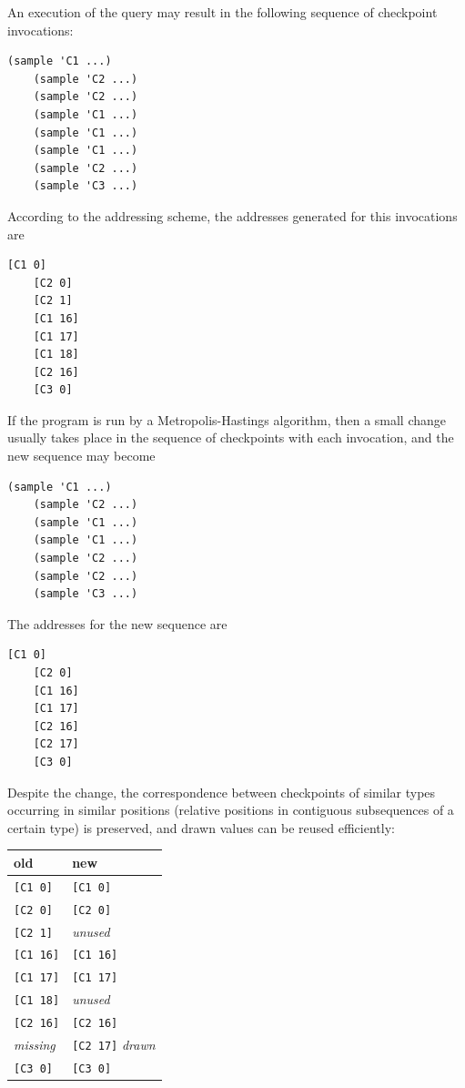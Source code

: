\documentclass[preprint]{sigplanconf}
\begin{document}
An execution of the query may result in the following
sequence of checkpoint invocations:
\begin{lstlisting}[style=default]
    (sample 'C1 ...)
    (sample 'C2 ...)
    (sample 'C2 ...)
    (sample 'C1 ...)
    (sample 'C1 ...)
    (sample 'C1 ...)
    (sample 'C2 ...)
    (sample 'C3 ...)
\end{lstlisting}
According to the addressing scheme, the addresses generated
for this invocations are
\begin{lstlisting}[style=default]
    [C1 0]
    [C2 0]
    [C2 1]
    [C1 16]
    [C1 17]
    [C1 18]
    [C2 16]
    [C3 0]
\end{lstlisting}
If the program is run by a Metropolis-Hastings algorithm, then a small change usually takes place in the sequence of checkpoints with each invocation, and the new sequence may become
\begin{lstlisting}[style=default]
    (sample 'C1 ...)
    (sample 'C2 ...)
    (sample 'C1 ...)
    (sample 'C1 ...)
    (sample 'C2 ...)
    (sample 'C2 ...)
    (sample 'C3 ...)
\end{lstlisting}
The addresses for the new sequence are
\begin{lstlisting}[style=default]
    [C1 0]
    [C2 0]
    [C1 16]
    [C1 17]
    [C2 16]
    [C2 17]
    [C3 0]
\end{lstlisting}
Despite the change, the correspondence between checkpoints of
similar types occurring in similar positions (relative positions
in contiguous subsequences of a certain type) is preserved, and
drawn values can be reused efficiently:

\vspace{\baselineskip}
{
\begin{tabular}{l l}
    \textbf{old} & \textbf{new} \\ \hline
    {}\texttt{[C1 0]} & \texttt{[C1 0]} \\
    {}\texttt{[C2 0]} & \texttt{[C2 0]} \\
    {}\texttt{[C2 1]} & \textit{unused} \\
    {}\texttt{[C1 16]} & \texttt{[C1 16]} \\
    {}\texttt{[C1 17]} & \texttt{[C1 17]} \\
    {}\texttt{[C1 18]} & \textit{unused} \\
    {}\texttt{[C2 16]} & \texttt{[C2 16]} \\
    \textit{missing} & \texttt{[C2 17]} \textit{drawn}\\
    {}\texttt{[C3 0]} & \texttt{[C3 0]}
\end{tabular}
\vspace{\baselineskip}}
\end{document}

